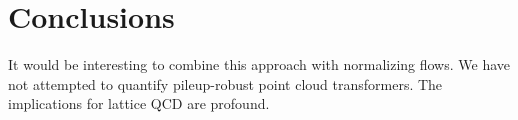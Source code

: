 \section{Conclusions}\label{sec:conclusions}

It would be interesting to combine this approach with normalizing flows.
We have not attempted to quantify pileup-robust point cloud
transformers. The implications for lattice QCD are profound.

